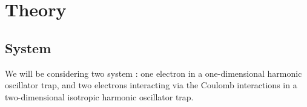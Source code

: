 \section{Theory}\label{sec:Theory}


\subsection{System}\label{sec:systems}

We will be considering two system : one electron in a one-dimensional harmonic oscillator trap, and two electrons interacting via the Coulomb interactions in a two-dimensional isotropic harmonic oscillator trap.

